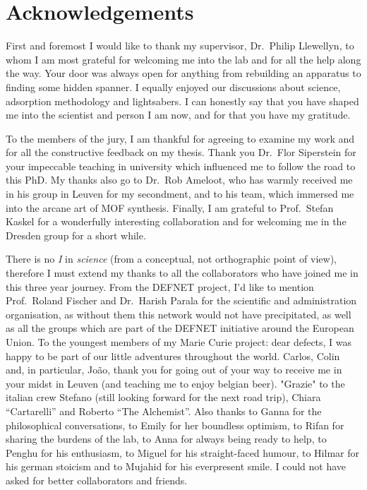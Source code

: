 
\chapter{Acknowledgements}

First and foremost I would like to thank my supervisor, Dr.\ Philip Llewellyn,
to whom I am most grateful for welcoming me into the lab and for all the help
along the way. Your door was always open for anything from rebuilding
an apparatus to finding some hidden spanner. I equally enjoyed our discussions
about science, adsorption methodology and lightsabers.
I can honestly say that you have shaped
me into the scientist and person I am now, and for that you have my gratitude.

To the members of the jury, I am thankful for agreeing to examine 
my work and for all the constructive feedback on my thesis.
Thank you Dr.\ Flor Siperstein for your impeccable teaching in university which
influenced me to follow the road to this PhD. My thanks also go to Dr.\ Rob Ameloot,
who has warmly received me in his group in Leuven for my secondment, and 
to his team, which immersed me into the arcane art of MOF synthesis.
Finally, I am grateful to Prof.\ Stefan Kaskel for a wonderfully interesting
collaboration and for welcoming me in the Dresden group for a
short while.

There is no \textit{I} in \textit{science} (from a conceptual, not orthographic
point of view), therefore I must extend my thanks to all the collaborators
who have joined me in this three year journey. From the DEFNET project,
I'd like to mention Prof.\ Roland Fischer and Dr.\ Harish Parala for the 
scientific and administration organisation, as without them this network
would not have precipitated, as well as all the groups which are part 
of the DEFNET initiative around the European Union. To the youngest members of 
my Marie Curie project: dear defects, I was happy to be part of our little
adventures throughout the world. Carlos, Colin and, in particular, João,
thank you for going out of your way to receive me in your midst in Leuven
(and teaching me to enjoy belgian beer). "Grazie" to the italian crew 
Stefano (still looking forward for the next road trip), Chiara ``Cartarelli''
and Roberto ``The Alchemist''. Also thanks to Ganna for the philosophical 
conversations, to Emily for her boundless optimism, to Rifan for sharing
the burdens of the lab, to Anna for always being ready to help,
to Penghu for his enthusiasm, to Miguel for his straight-faced humour,
to Hilmar for his german stoicism and to Mujahid for his everpresent smile.
I could not have asked for better collaborators and friends.

